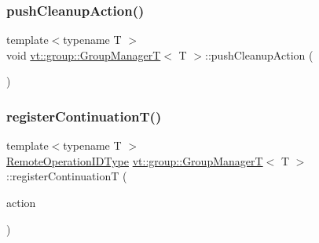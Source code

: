 \subsubsection{\texorpdfstring{push\+Cleanup\+Action()}{pushCleanupAction()}}
{\footnotesize\ttfamily template$<$typename T $>$ \\
void \hyperlink{structvt_1_1group_1_1_group_manager_t}{vt\+::group\+::\+Group\+ManagerT}$<$ T $>$\+::push\+Cleanup\+Action (\begin{DoxyParamCaption}{ }\end{DoxyParamCaption})\hspace{0.3cm}{\ttfamily [static]}}

\mbox{\label{structvt_1_1group_1_1_group_manager_t_aa52eafbcdd4d1e8da4f17ef4cd03098a}} 
\subsubsection{\texorpdfstring{register\+Continuation\+T()}{registerContinuationT()}\hspace{0.1cm}{\footnotesize\ttfamily [1/2]}}
{\footnotesize\ttfamily template$<$typename T $>$ \\
\hyperlink{namespacevt_1_1group_a73f2624ddeb535b39a08b6524f26b244}{Remote\+Operation\+I\+D\+Type} \hyperlink{structvt_1_1group_1_1_group_manager_t}{vt\+::group\+::\+Group\+ManagerT}$<$ T $>$\+::register\+ContinuationT (\begin{DoxyParamCaption}\item[{\hyperlink{structvt_1_1group_1_1_group_manager_t_acb20922687d3165d97de391fdbaf02ca}{Action\+T\+Type}}]{action }\end{DoxyParamCaption})\hspace{0.3cm}{\ttfamily [static]}}

\mbox{\label{structvt_1_1group_1_1_group_manager_t_a0c366044c727d883691f89550c9706cd}} 
